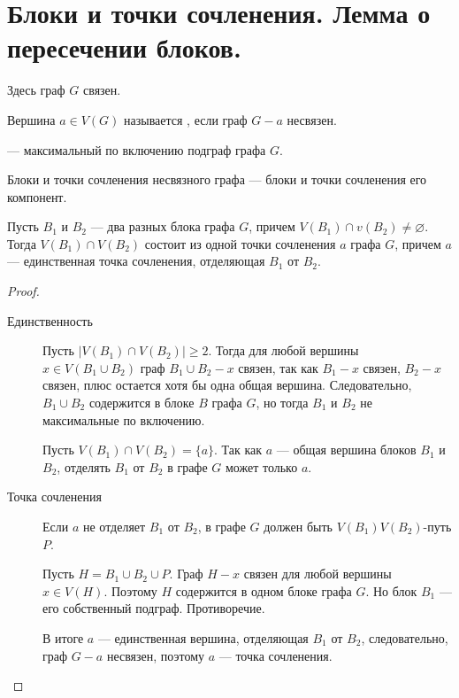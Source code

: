 \section{Блоки и точки сочленения. Лемма о пересечении блоков.}
Здесь граф $G$ связен.
\begin{definition}
	Вершина $a \in V(G)$ называется , если граф $G-a$ несвязен.
\end{definition}
\begin{definition}
     --- максимальный по включению подграф графа $G$.
\end{definition}
\begin{definition}
    Блоки и точки сочленения несвязного графа --- блоки и точки сочленения его компонент.
\end{definition}

\begin{lemma}\label{lm:connectivity_1}
    Пусть $B_1$ и $B_2$ --- два разных блока графа $G$, причем $V(B_1) \cap v(B_2) \neq \varnothing$. Тогда $V(B_1) \cap V(B_2)$ состоит из одной точки сочленения $a$ графа $G$, причем $a$ --- единственная  точка сочленения, отделяющая $B_1$ от $B_2$.
\end{lemma}
\begin{proof}
    \begin{description}
		\item[Единственность] Пусть $\lvert V(B_1) \cap V(B_2) \rvert \ge 2$. Тогда для любой вершины $x \in  V(B_1 \cup B_2)$ граф $B_1 \cup B_2 - x$ связен, так как $B_1 - x$ связен, $B_2-x$ связен, плюс остается хотя бы одна общая вершина. Следовательно, $B_1 \cup B_2$ содержится в блоке $B$ графа $G$, но тогда $B_1$ и $B_2$ не максимальные по включению.

			Пусть $V(B_1) \cap V(B_2) = \{a\}$. Так как $a $ --- общая вершина блоков $B_1$ и $B_2$, отделять $B_{1}$ от $B_2$ в графе $G$ может только $a$.
		\item[Точка сочленения] Если $a$ не отделяет $B_1$ от $B_2$, в графе $G$ должен быть $V(B_1)V(B_2)$-путь $P$.
			
			Пусть $H = B_1 \cup B_2 \cup P$. Граф $H-x$ связен для любой вершины $x \in V(H)$. Поэтому $H$ содержится в одном блоке графа $G$. Но блок $B_1$  --- его собственный подграф. Противоречие. 

		В итоге $a$ --- единственная вершина, отделяющая $B_1$ от $B_2$, следовательно, граф $G - a$ несвязен, поэтому $a$ --- точка сочленения.
    \end{description}
\end{proof}
